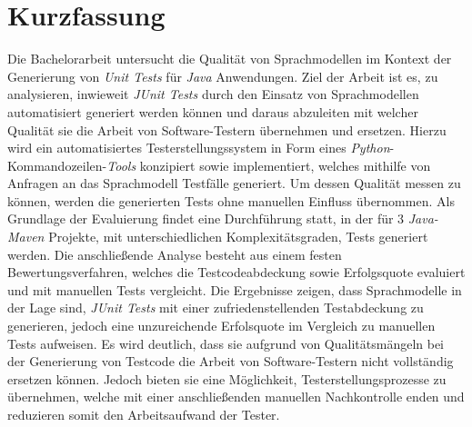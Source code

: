 

\clearpage
\chapter*{Kurzfassung}
Die Bachelorarbeit untersucht die Qualität von Sprachmodellen im Kontext der Generierung von \textit{Unit Tests} für \textit{Java} Anwendungen. Ziel der Arbeit ist es, zu analysieren, inwieweit \textit{JUnit Tests} durch den Einsatz von Sprachmodellen automatisiert generiert werden können und daraus abzuleiten mit welcher Qualität sie die Arbeit von Software-Testern übernehmen und ersetzen. Hierzu wird ein automatisiertes Testerstellungssystem in Form eines \textit{Python}-Kommandozeilen-\textit{Tools} konzipiert sowie implementiert, welches mithilfe von Anfragen an das Sprachmodell Testfälle generiert. Um dessen Qualität messen zu können, werden die generierten Tests ohne manuellen Einfluss übernommen. Als Grundlage der Evaluierung findet eine Durchführung statt, in der für 3 \textit{Java-Maven} Projekte, mit unterschiedlichen Komplexitätsgraden, Tests generiert werden. Die anschließende Analyse besteht aus einem festen Bewertungsverfahren, welches die Testcodeabdeckung sowie Erfolgsquote evaluiert und mit manuellen Tests vergleicht. Die Ergebnisse zeigen, dass Sprachmodelle in der Lage sind, \textit{JUnit Tests} mit einer zufriedenstellenden Testabdeckung zu generieren, jedoch eine unzureichende Erfolsquote im Vergleich zu manuellen Tests aufweisen. Es wird deutlich, dass sie aufgrund von Qualitätsmängeln bei der Generierung von Testcode die Arbeit von Software-Testern nicht vollständig ersetzen können. Jedoch bieten sie eine Möglichkeit, Testerstellungsprozesse zu übernehmen, welche mit einer anschließenden manuellen Nachkontrolle enden und reduzieren somit den Arbeitsaufwand der Tester.\\\\
